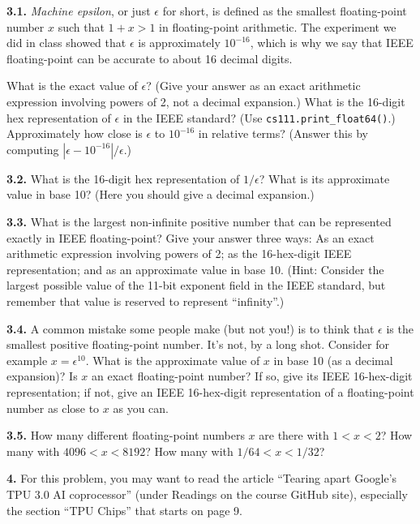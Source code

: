 \documentclass[11pt]{article}
\begin{document}
\par\medskip
{\bf 3.1.}
{\em Machine epsilon}, or just $\epsilon$ for short, is defined as the smallest 
floating-point number $x$ such that $1+x > 1$ in floating-point arithmetic.
The experiment we did in class showed that $\epsilon$ is approximately $10^{-16}$,
which is why we say that IEEE floating-point can be accurate to
about 16 decimal digits.

What is the exact value of $\epsilon$? 
(Give your answer as an exact arithmetic expression involving powers of 2, 
not a decimal expansion.) 
What is the 16-digit hex representation of $\epsilon$ in the IEEE standard? 
(Use {\tt cs111.print\_float64()}.)
Approximately how close is $\epsilon$ to $10^{-16}$ in relative terms?
(Answer this by computing $|\epsilon-10^{-16}|/\epsilon$.)

\par\medskip
{\bf 3.2.}
What is the 16-digit hex representation of $1/\epsilon$? 
What is its approximate value in base 10? 
(Here you should give a decimal expansion.)

\par\medskip
{\bf 3.3.}
What is the largest non-infinite positive number that can be represented exactly
in IEEE floating-point? 
Give your answer three ways: 
As an exact arithmetic expression involving powers of 2;
as the 16-hex-digit IEEE representation;
and as an approximate value in base 10. 
(Hint: Consider the largest possible value of the 11-bit exponent field 
in the IEEE standard, but remember that value is reserved to represent ``infinity''.)

\par\medskip
{\bf 3.4.}
A common mistake some people make (but not you!) is to think that $\epsilon$ is
the smallest positive floating-point number. 
It's not, by a long shot. 
Consider for example $x = \epsilon^{10}$. 
What is the approximate value of $x$ in base 10 (as a decimal expansion)?
Is $x$ an exact floating-point number? 
If so, give its IEEE 16-hex-digit representation;
if not, give an IEEE 16-hex-digit representation of a floating-point number as
close to $x$ as you can.

\par\medskip 
{\bf 3.5.}
How many different floating-point numbers $x$ are there with $1 < x < 2$?
How many with $4096 < x < 8192$?  How many with $1/64 < x < 1/32$?


\par\bigskip
{\bf 4.}
For this problem, you may want to read the article 
``Tearing apart Google's TPU 3.0 AI coprocessor'' 
(under Readings on the course GitHub site),
especially the section ``TPU Chips'' that starts on page 9.
\end{document}
